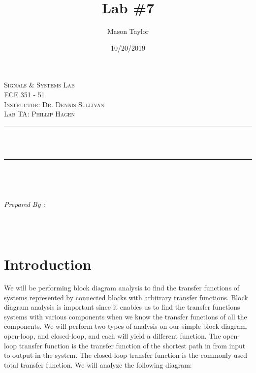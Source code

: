 \documentclass[12pt]{report}
\title{Lab \#7}
\date{10/20/2019}
\author{Mason Taylor}
\makeatletter
\let\thetitle\@title
\let\theauthor\@author
\let\thedate\@date
\makeatother
\begin{document}
    
    
\begin{titlepage}
	\centering
\begin{center}    
    \textsc{\Large Signals \& Systems Lab}\\[2.0 cm]	
    \textsc{\Large ECE 351 - 51}\\[0.5 cm]
    \textsc{\small Instructor: Dr. Dennis Sullivan}\\[0.5 cm]
    \textsc{\small Lab TA: Phillip Hagen}
\end{center}
	\rule{\linewidth}{0.4 mm} \\[0.4 cm]
	{ \huge \bfseries \thetitle}\\
	\rule{\linewidth}{0.4 mm} \\[1.5 cm]
	
	\begin{minipage}{0.4\textwidth}
		\begin{flushleft} \large
			\end{flushleft}
			\end{minipage}~
			\begin{minipage}{0.4\textwidth}
            
			\begin{flushright} \large
			\emph{Prepared By :} \\
			\theauthor  \\
			\thedate
		\end{flushright}  
	\end{minipage}\\[2 cm]
\end{titlepage}
    \tableofcontents
    \pagebreak


    
\hypertarget{introduction}{%
\chapter{Introduction}\label{introduction}}

We will be performing block diagram analysis to find the transfer
functions of systems represented by connected blocks with arbitrary
transfer functions. Block diagram analysis is important since it enables
us to find the transfer functions systems with various components when
we know the transfer functions of all the components. We will perform
two types of analysis on our simple block diagram, open-loop, and
closed-loop, and each will yield a different function. The open-loop
transfer function is the transfer function of the shortest path in from
input to output in the system. The closed-loop transfer function is the
commonly used total transfer function. We will analyze the following
diagram:
\end{document}
